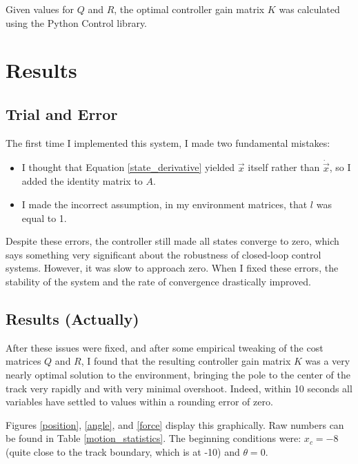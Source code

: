 \documentclass[11pt]{article}
\begin{document}
Given values for $Q$ and $R$, the optimal controller gain matrix $K$ was calculated using the Python Control library.

\section{Results}

\subsection{Trial and Error}

The first time I implemented this system, I made two fundamental mistakes:

\begin{itemize}
    \item I thought that Equation \ref{state_derivative} yielded $\vec{x}$ itself rather than $\dot{\vec{x}}$, so I added the identity matrix to $A$.
    \item I made the incorrect assumption, in my environment matrices, that $l$ was equal to 1.
\end{itemize}

Despite these errors, the controller still made all states converge to zero, which says something very significant about the robustness of closed-loop control systems. However, it was slow to approach zero. When I fixed these errors, the stability of the system and the rate of convergence drastically improved.

\subsection{Results (Actually)}

After these issues were fixed, and after some empirical tweaking of the cost matrices $Q$ and $R$, I found that the resulting controller gain matrix $K$ was a very nearly optimal solution to the environment, bringing the pole to the center of the track very rapidly and with very minimal overshoot. Indeed, within 10 seconds all variables have settled to values within a rounding error of zero.

Figures \ref{position}, \ref{angle}, and \ref{force} display this graphically. Raw numbers can be found in Table \ref{motion_statistics}. The beginning conditions were: $x _c = -8$ (quite close to the track boundary, which is at -10) and $\theta = 0$.
\end{document}
